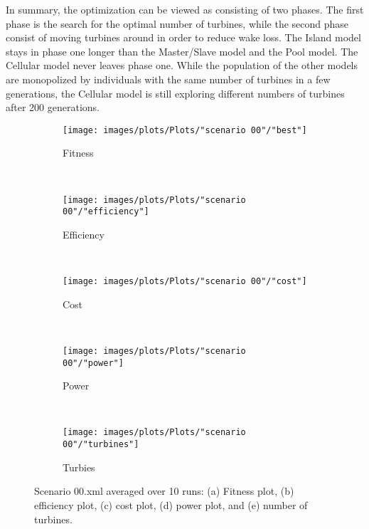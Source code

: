\noindent In summary, the optimization can be viewed as consisting of two phases. The first phase is the search for the optimal number of turbines, while the second phase consist of moving turbines around in order to reduce wake loss. The Island model stays in phase one longer than the Master/Slave model and the Pool model. The Cellular model never leaves phase one. While the population of the other models are monopolized by individuals with the same number of turbines in a few generations, the Cellular model is still exploring different numbers of turbines after 200 generations. \\

\begin{figure}[h!]
    \centering
      \begin{subfigure}[b]{0.45\textwidth}
        \texttt{[image: images/plots/Plots/"scenario 00"/"best"]}
        \caption{Fitness}
        \hfill
        \label{plot:fitness plot scenario 00}
    \end{subfigure}
    ~
      \begin{subfigure}[b]{0.45\textwidth}
        \texttt{[image: images/plots/Plots/"scenario 00"/"efficiency"]}
        \caption{Efficiency}
        \hfill
        \label{plot:efficiency plot scenario 00}
    \end{subfigure}
    ~
    \begin{subfigure}[b]{0.45\textwidth}
        \texttt{[image: images/plots/Plots/"scenario 00"/"cost"]}
        \caption{Cost}
        \hfill
        \label{plot:cost plot scenario 00}
    \end{subfigure}
    ~
    \begin{subfigure}[b]{0.45\textwidth}
        \texttt{[image: images/plots/Plots/"scenario 00"/"power"]}
        \caption{Power}
        \hfill
        \label{plot:power plot scenario 00}
    \end{subfigure}
    ~
    \begin{subfigure}[b]{0.45\textwidth}
        \texttt{[image: images/plots/Plots/"scenario 00"/"turbines"]}
        \caption{Turbies}
        \hfill
        \label{plot:turbines plot scenario 00}
    \end{subfigure}
    \caption{Scenario 00.xml averaged over 10 runs: (a) Fitness plot, (b) efficiency plot, (c) cost plot, (d) power plot, and (e) number of turbines.}
    \label{plot:scenario 00}
\end{figure}


